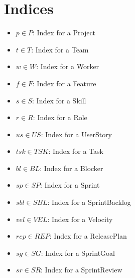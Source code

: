 \documentclass[11pt]{article}
\begin{document}
\section{Indices}
\begin{itemize}
    \item $p \in P$: Index for a Project
    \item $t \in T$: Index for a Team
    \item $w \in W$: Index for a Worker
    \item $f \in F$: Index for a Feature
    \item $s \in S$: Index for a Skill
    \item $r \in R$: Index for a Role
    \item $us \in US$: Index for a UserStory
    \item $tsk \in TSK$: Index for a Task
    \item $bl \in BL$: Index for a Blocker
    \item $sp \in SP$: Index for a Sprint
    \item $sbl \in SBL$: Index for a SprintBacklog
    \item $vel \in VEL$: Index for a Velocity
    \item $rep \in REP$: Index for a ReleasePlan
    \item $sg \in SG$: Index for a SprintGoal
    \item $sr \in SR$: Index for a SprintReview
\end{itemize}
\end{document}
